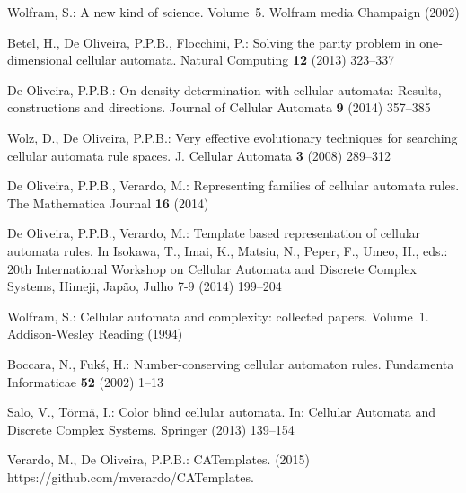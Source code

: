 \documentclass{llncs}
\begin{document}
\begin{thebibliography}{10}
Wolfram, S.:
\newblock A new kind of science. Volume~5.
\newblock Wolfram media Champaign (2002)

Betel, H., {De Oliveira}, P.P.B., Flocchini, P.:
\newblock Solving the parity problem in one-dimensional cellular automata.
\newblock Natural Computing \textbf{12} (2013)  323--337

{De Oliveira}, P.P.B.:
\newblock On density determination with cellular automata: Results,
  constructions and directions.
\newblock Journal of Cellular Automata \textbf{9} (2014)  357--385

Wolz, D., {De Oliveira}, P.P.B.:
\newblock Very effective evolutionary techniques for searching cellular
  automata rule spaces.
\newblock J. Cellular Automata \textbf{3} (2008)  289--312

{De Oliveira}, P.P.B., Verardo, M.:
\newblock Representing families of cellular automata rules.
\newblock The Mathematica Journal \textbf{16} (2014)

{De Oliveira}, P.P.B., Verardo, M.:
\newblock Template based representation of cellular automata rules.
\newblock In Isokawa, T., Imai, K., Matsiu, N., Peper, F., Umeo, H., eds.: 20th
  International Workshop on Cellular Automata and Discrete Complex Systems,
  Himeji, Japão, Julho 7-9 (2014)  199--204

Wolfram, S.:
\newblock Cellular automata and complexity: collected papers. Volume~1.
\newblock Addison-Wesley Reading (1994)

Boccara, N., {Fuk\'{s}}, H.:
\newblock Number-conserving cellular automaton rules.
\newblock Fundamenta Informaticae \textbf{52} (2002)  1--13

Salo, V., T{\"o}rm{\"a}, I.:
\newblock Color blind cellular automata.
\newblock In: Cellular Automata and Discrete Complex Systems.
\newblock Springer (2013)  139--154

Verardo, M., {De Oliveira}, P.P.B.:
\newblock CATemplates. (2015) https://github.com/mverardo/CATemplates.

\end{thebibliography}
\end{document}
